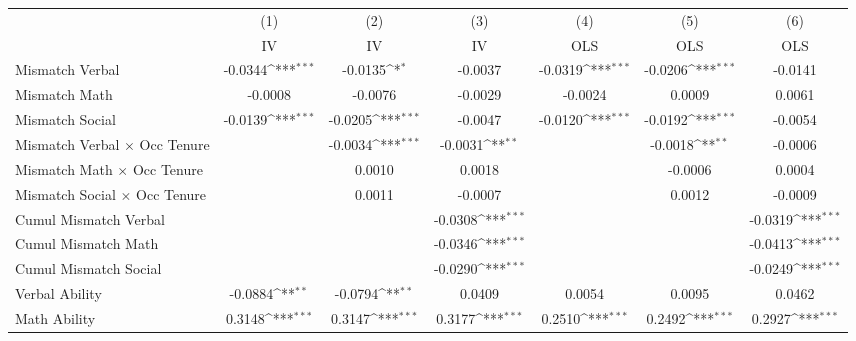 {
\def\sym#1{\ifmmode^{#1}\else\(^{#1}\)\fi}
\begin{tabular}{l*{6}{c}}
\hline  
                    &\multicolumn{1}{c}{(1)}&\multicolumn{1}{c}{(2)}&\multicolumn{1}{c}{(3)}&\multicolumn{1}{c}{(4)}&\multicolumn{1}{c}{(5)}&\multicolumn{1}{c}{(6)}\\
                    &\multicolumn{1}{c}{IV}&\multicolumn{1}{c}{IV}&\multicolumn{1}{c}{IV}&\multicolumn{1}{c}{OLS}&\multicolumn{1}{c}{OLS}&\multicolumn{1}{c}{OLS}\\
\hline  
Mismatch Verbal     &     -0.0344\sym{***}&     -0.0135\sym{*}  &     -0.0037         &     -0.0319\sym{***}&     -0.0206\sym{***}&     -0.0141         \\
[1em]
Mismatch Math       &     -0.0008         &     -0.0076         &     -0.0029         &     -0.0024         &      0.0009         &      0.0061         \\
[1em]
Mismatch Social     &     -0.0139\sym{***}&     -0.0205\sym{***}&     -0.0047         &     -0.0120\sym{***}&     -0.0192\sym{***}&     -0.0054         \\
[1em]
Mismatch Verbal $\times$ Occ Tenure&                     &     -0.0034\sym{***}&     -0.0031\sym{**} &                     &     -0.0018\sym{**} &     -0.0006         \\
[1em]
Mismatch Math $\times$ Occ Tenure&                     &      0.0010         &      0.0018         &                     &     -0.0006         &      0.0004         \\
[1em]
Mismatch Social $\times$ Occ Tenure&                     &      0.0011         &     -0.0007         &                     &      0.0012         &     -0.0009         \\
[1em]
Cumul Mismatch Verbal&                     &                     &     -0.0308\sym{***}&                     &                     &     -0.0319\sym{***}\\
[1em]
Cumul Mismatch Math &                     &                     &     -0.0346\sym{***}&                     &                     &     -0.0413\sym{***}\\
[1em]
Cumul Mismatch Social&                     &                     &     -0.0290\sym{***}&                     &                     &     -0.0249\sym{***}\\
[1em]
Verbal Ability      &     -0.0884\sym{**} &     -0.0794\sym{**} &      0.0409         &      0.0054         &      0.0095         &      0.0462         \\
[1em]
Math Ability        &      0.3148\sym{***}&      0.3147\sym{***}&      0.3177\sym{***}&      0.2510\sym{***}&      0.2492\sym{***}&      0.2927\sym{***}\\

\end{tabular}}
